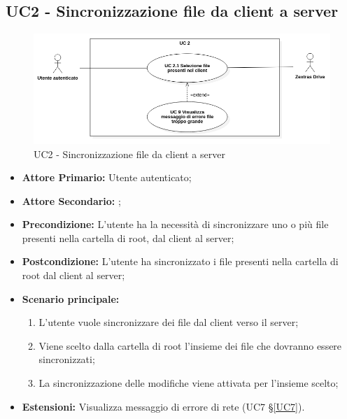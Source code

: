 \subsection{UC2 - Sincronizzazione file da client a server}
\label{UC2}
\begin{figure}[H]
    \centering
    \includegraphics[scale = 0.5]{components/img/UC2.png}
    \caption{UC2 - Sincronizzazione file da client a server}
\end{figure}
\begin{itemize}
\item \textbf{Attore Primario:} Utente autenticato;
\item \textbf{Attore Secondario:} ;
\item \textbf{Precondizione:} L'utente ha la necessità di sincronizzare uno o più file presenti nella cartella di root, dal client al server;
\item \textbf{Postcondizione:} L'utente ha sincronizzato i file presenti nella cartella di root dal client al server;
\item \textbf{Scenario principale:}
    \begin{enumerate}
    \item L'utente vuole sincronizzare dei file dal client verso il server;
    \item Viene scelto dalla cartella di root l'insieme dei file che dovranno essere sincronizzati;
    \item La sincronizzazione delle modifiche viene attivata per l'insieme scelto;
    \end{enumerate}
\item \textbf{Estensioni:} Visualizza messaggio di errore di rete (UC7 \S{}\ref{UC7}).
\end{itemize}

